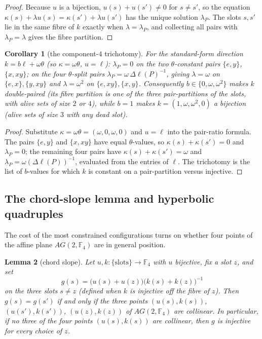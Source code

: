 \documentclass[11pt]{article}
\newcommand{\F}[1]{\mathbb{F}_{#1}}
\newcommand{\slab}{\ell}                          %
\theoremstyle{plain}
\newtheorem{lemma}{Lemma}[section]
\newtheorem{corollary}[lemma]{Corollary}
\theoremstyle{definition}
\theoremstyle{remark}
\begin{document}
\begin{proof}
Because $u$ is a bijection, $u(s)+u(s')\ne 0$ for $s\ne s'$, so the equation
$\kappa(s)+\lambda u(s)=\kappa(s')+\lambda u(s')$ has the unique solution
$\lambda_P$. The slots $s,s'$ lie in the same fibre of $k$ exactly when
$\lambda=\lambda_P$, and collecting all pairs with $\lambda_P=\lambda$ gives the
fibre partition.
\end{proof}

\begin{corollary}[the component-$4$ trichotomy]\label{cor:comp4trich}
For the standard-form direction $k=b\slab+\omega\theta$ (so $\kappa=\omega\theta$,
$u=\slab$): $\lambda_P=0$ on the two $\theta$-constant pairs $\{e,y\}$,
$\{x,xy\}$; on the four $\theta$-split pairs
$\lambda_P=\omega\,\Delta\slab(P)^{-1}$, giving $\lambda=\omega$ on
$\{e,x\},\{y,xy\}$ and $\lambda=\omega^2$ on $\{e,xy\},\{x,y\}$. Consequently
$b\in\{0,\omega,\omega^2\}$ makes $k$ double-paired (its fibre partition is one of
the three pair-partitions of the slots, with alive sets of size $2$ or $4$),
while $b=1$ makes $k=(1,\omega,\omega^2,0)$ a bijection (alive sets of size $3$
with any dead slot).
\end{corollary}

\begin{proof}
Substitute $\kappa=\omega\theta=(\omega,0,\omega,0)$ and $u=\slab$ into the
pair-ratio formula. The pairs $\{e,y\}$ and $\{x,xy\}$ have equal
$\theta$-values, so $\kappa(s)+\kappa(s')=0$ and $\lambda_P=0$; the remaining
four pairs have $\kappa(s)+\kappa(s')=\omega$ and $\lambda_P=\omega(\Delta
\slab(P))^{-1}$, evaluated from the entries of $\slab$. The trichotomy is the
list of $b$-values for which $k$ is constant on a pair-partition versus
injective.
\end{proof}

\subsection{The chord-slope lemma and hyperbolic quadruples}\label{ssec:chord}

The cost of the most constrained configurations turns on whether four points of
the affine plane $AG(2,\F4)$ are in general position.

\begin{lemma}[chord slope]\label{lem:chord}
Let $u,k\colon\{\text{slots}\}\to\F4$ with $u$ bijective, fix a slot $z$, and set
\[
  g(s)=\bigl(u(s)+u(z)\bigr)\bigl(k(s)+k(z)\bigr)^{-1}
\]
on the three slots $s\ne z$ (defined when $k$ is injective off the fibre of $z$).
Then $g(s)=g(s')$ if and only if the three points $(u(s),k(s))$,
$(u(s'),k(s'))$, $(u(z),k(z))$ of $AG(2,\F4)$ are collinear. In particular, if
no three of the four points $(u(s),k(s))$ are collinear, then $g$ is injective
for every choice of $z$.
\end{lemma}
\end{document}
